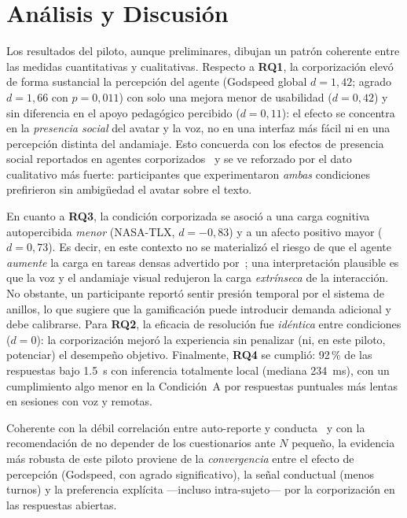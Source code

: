 \documentclass[conference]{IEEEtran}
\begin{document}
\section{An\'alisis y Discusi\'on}
\label{sec:discussion}
Los resultados del piloto, aunque preliminares, dibujan un patr\'on coherente entre las medidas
cuantitativas y cualitativas. Respecto a \textbf{RQ1}, la corporizaci\'on elev\'o de forma
sustancial la percepci\'on del agente (Godspeed global $d=1{,}42$; agrado $d=1{,}66$ con
$p=0{,}011$) con solo una mejora menor de usabilidad ($d=0{,}42$) y sin diferencia en el apoyo
pedag\'ogico percibido ($d=0{,}11$): el efecto se concentra en la \emph{presencia social} del
avatar y la voz, no en una interfaz m\'as f\'acil ni en una percepci\'on distinta del andamiaje.
Esto concuerda con los efectos de presencia social reportados en agentes
corporizados~\cite{elhajji2025architecture,sonlu2024scoping} y se ve reforzado por el dato
cualitativo m\'as fuerte: participantes que experimentaron \emph{ambas} condiciones prefirieron sin
ambig\"uedad el avatar sobre el texto.

En cuanto a \textbf{RQ3}, la condici\'on corporizada se asoci\'o a una carga cognitiva
autopercibida \emph{menor} (NASA-TLX, $d=-0{,}83$) y a un afecto positivo mayor ($d=0{,}73$). Es
decir, en este contexto no se materializ\'o el riesgo de que el agente \emph{aumente} la carga en
tareas densas advertido por~\cite{li2025cognitiveload}; una interpretaci\'on plausible es que la
voz y el andamiaje visual redujeron la carga \emph{extr\'inseca} de la interacci\'on. No obstante,
un participante report\'o sentir presi\'on temporal por el sistema de anillos, lo que sugiere que la
gamificaci\'on puede introducir demanda adicional y debe calibrarse. Para \textbf{RQ2}, la eficacia
de resoluci\'on fue \emph{id\'entica} entre condiciones ($d=0$): la corporizaci\'on mejor\'o la
experiencia sin penalizar (ni, en este piloto, potenciar) el desempe\~no objetivo. Finalmente,
\textbf{RQ4} se cumpli\'o: 92\,\% de las respuestas bajo 1.5~s con inferencia totalmente local
(mediana 234~ms), con un cumplimiento algo menor en la Condici\'on~A por respuestas puntuales m\'as
lentas en sesiones con voz y remotas.

Coherente con la d\'ebil correlaci\'on entre auto-reporte y conducta~\cite{dang2020selfreport} y
con la recomendaci\'on de no depender de los cuestionarios ante $N$ peque\~no, la evidencia m\'as
robusta de este piloto proviene de la \emph{convergencia} entre el efecto de percepci\'on
(Godspeed, con agrado significativo), la se\~nal conductual (menos turnos) y la preferencia
expl\'icita ---incluso intra-sujeto--- por la corporizaci\'on en las respuestas abiertas.
\end{document}
